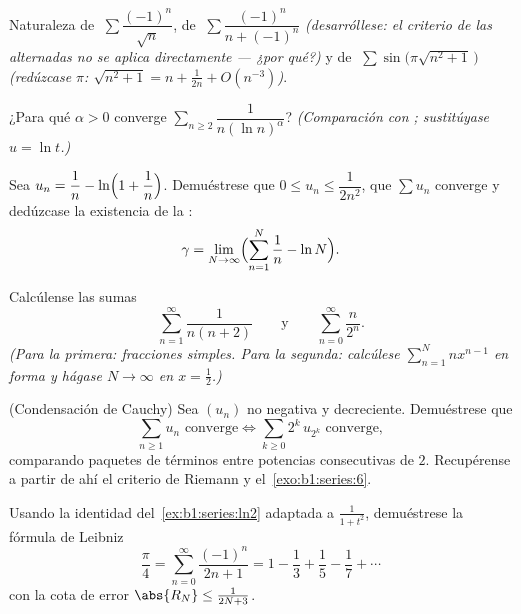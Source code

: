 \begin{exercise}[$\star\star$]\label{exo:b1:series:5}
Naturaleza de $\;\sum \dfrac{(-1)^n}{\sqrt n}$, de $\;\sum
\dfrac{(-1)^n}{n + (-1)^n}$ \emph{(desarróllese: el criterio de las
alternadas no se aplica directamente --- ¿por qué?)} y de $\;\sum
\sin\bigl(\pi\sqrt{n^2+1}\,\bigr)$ \emph{(redúzcase  $\pi$:
$\sqrt{n^2+1} = n + \frac{1}{2n} + O(n^{-3})$)}.
\end{exercise}

\begin{exercise}[$\star\star$]\label{exo:b1:series:6}
¿Para qué $\alpha > 0$ converge
$\sum_{n \geq 2} \dfrac{1}{n (\ln n)^{\alpha}}$? \emph{(Comparación
con ; sustitúyase $u = \ln t$.)}
\end{exercise}

\begin{exercise}[$\star\star$]\label{exo:b1:series:7}
Sea $u_n = \dfrac{1}{n} - \ln\Bigl(1 + \dfrac1n\Bigr)$. Demuéstrese
que $0 \leq u_n \leq \dfrac{1}{2n^2}$, que $\sum u_n$ converge y
dedúzcase la existencia de la :
\[
\gamma = \lim_{N \to \infty} \Bigl( \sum_{n=1}^{N} \frac 1n - \ln N
\Bigr) .
\]
\end{exercise}

\begin{exercise}[$\star\star$]\label{exo:b1:series:8}
Calcúlense las sumas
\[
\sum_{n=1}^{\infty} \frac{1}{n(n+2)}
\qquad\text{y}\qquad
\sum_{n=0}^{\infty} \frac{n}{2^n} .
\]
\emph{(Para la primera: fracciones simples. Para la segunda:
calcúlese $\sum_{n=1}^{N} n x^{n-1}$ en forma  y hágase
$N \to \infty$ en $x = \frac12$.)}
\end{exercise}

\begin{exercise}[$\star\star\star$]\label{exo:b1:series:9}
(Condensación de Cauchy) Sea $(u_n)$ no negativa y decreciente.
Demuéstrese que
\[
\sum_{n \geq 1} u_n \text{ converge}
\iff
\sum_{k \geq 0} 2^k\, u_{2^k} \text{ converge},
\]
comparando paquetes de términos entre potencias consecutivas de $2$.
Recupérense a partir de ahí el criterio de Riemann y
el~\cref{exo:b1:series:6}.
\end{exercise}

\begin{exercise}[$\star\star\star$]\label{exo:b1:series:10}
Usando la identidad  del~\cref{ex:b1:series:ln2} adaptada a
$\frac{1}{1+t^2}$, demuéstrese la fórmula de Leibniz
\[
\frac{\pi}{4} = \sum_{n=0}^{\infty} \frac{(-1)^n}{2n+1}
= 1 - \frac13 + \frac15 - \frac17 + \cdots
\]
con la cota de error $\abs{R_N} \leq \frac{1}{2N+3}$.
\end{exercise}

